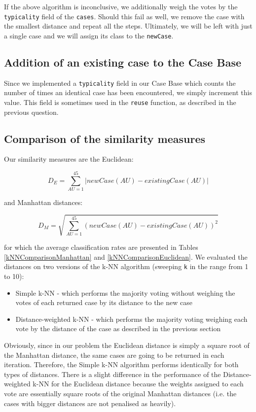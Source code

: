 \documentclass[a4paper]{article}
\begin{document}
If the above algorithm is inconclusive, we additionally weigh the votes by the \texttt{typicality} field of the \texttt{cases}. Should this fail as well, we remove the case with the smallest distance and repeat all the steps. Ultimately, we will be left with just a single case and we will assign its class to the \texttt{newCase}.

\subsection{Addition of an existing case to the Case Base}

Since we implemented a \texttt{typicality} field in our Case Base which counts the number of times an identical case has been encountered, we simply increment this value. This field is sometimes used in the \texttt{reuse} function, as described in the previous question.

\subsection{Comparison of the similarity measures}

Our similarity measures are the Euclidean:

\begin{equation}
D_E = \sum_{AU = 1}^{45} \left | newCase(AU) - existingCase(AU)\right |
\end{equation}

and Manhattan distances:

\begin{equation}
D_M = \sqrt{ \sum_{AU = 1}^{45} \left ( newCase(AU) - existingCase(AU)\right )^{2} }
\end{equation}

for which the average classification rates are presented in Tables \ref{kNNComparisonManhattan} and \ref{kNNComparisonEuclidean}. We evaluated the distances on two versions of the k-NN algorithm (sweeping \texttt{k} in the range from 1 to 10):
\begin{itemize}
\item Simple k-NN - which performs the majority voting without weighing the votes of each returned case by its distance to the new case
\item Distance-weighted k-NN - which performs the majority voting weighing each vote by the distance of the case as described in the previous section
\end{itemize}

Obviously, since in our problem the Euclidean distance is simply a square root of the Manhattan distance, the same cases are going to be returned in each iteration. Therefore, the Simple k-NN algorithm performs identically for both types of distances. There is a slight difference in the performance of the Distance-weighted k-NN for the Euclidean distance because the weights assigned to each vote are essentially square roots of the original Manhattan distances (i.e. the cases with bigger distances are not penalised as heavily).
\end{document}
